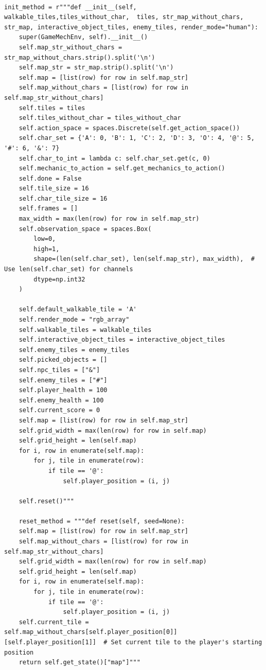 \documentclass{article} %
\begin{document}
\begin{lstlisting}

init_method = r"""def __init__(self, walkable_tiles,tiles_without_char,  tiles, str_map_without_chars, str_map, interactive_object_tiles, enemy_tiles, render_mode="human"):
    super(GameMechEnv, self).__init__()
    self.map_str_without_chars = str_map_without_chars.strip().split('\n')
    self.map_str = str_map.strip().split('\n')
    self.map = [list(row) for row in self.map_str]
    self.map_without_chars = [list(row) for row in self.map_str_without_chars]
    self.tiles = tiles
    self.tiles_without_char = tiles_without_char
    self.action_space = spaces.Discrete(self.get_action_space())
    self.char_set = {'A': 0, 'B': 1, 'C': 2, 'D': 3, 'O': 4, '@': 5, '#': 6, '&': 7}
    self.char_to_int = lambda c: self.char_set.get(c, 0)
    self.mechanic_to_action = self.get_mechanics_to_action()
    self.done = False
    self.tile_size = 16
    self.char_tile_size = 16
    self.frames = []
    max_width = max(len(row) for row in self.map_str)
    self.observation_space = spaces.Box(
        low=0, 
        high=1,
        shape=(len(self.char_set), len(self.map_str), max_width),  # Use len(self.char_set) for channels
        dtype=np.int32
    )
    
    self.default_walkable_tile = 'A'
    self.render_mode = "rgb_array"
    self.walkable_tiles = walkable_tiles
    self.interactive_object_tiles = interactive_object_tiles
    self.enemy_tiles = enemy_tiles
    self.picked_objects = []
    self.npc_tiles = ["&"]
    self.enemy_tiles = ["#"]
    self.player_health = 100
    self.enemy_health = 100
    self.current_score = 0
    self.map = [list(row) for row in self.map_str]
    self.grid_width = max(len(row) for row in self.map)
    self.grid_height = len(self.map)
    for i, row in enumerate(self.map):
        for j, tile in enumerate(row):
            if tile == '@':
                self.player_position = (i, j)
    
    self.reset()"""

    reset_method = """def reset(self, seed=None):
    self.map = [list(row) for row in self.map_str]
    self.map_without_chars = [list(row) for row in self.map_str_without_chars]
    self.grid_width = max(len(row) for row in self.map)
    self.grid_height = len(self.map)
    for i, row in enumerate(self.map):
        for j, tile in enumerate(row):
            if tile == '@':
                self.player_position = (i, j)
    self.current_tile = self.map_without_chars[self.player_position[0]][self.player_position[1]]  # Set current tile to the player's starting position
    return self.get_state()["map"]"""


\end{lstlisting}
\end{document}
